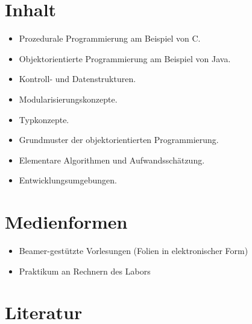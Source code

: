 \hypertarget{inhaltpathlabelmi-2017modulbeschreibungen-bachelorba_algorithmenundprogrammierung1}{%
\section*{Inhalt\label{/mi-2017/modulbeschreibungen-bachelor/BA_AlgorithmenundProgrammierung1}}\label{inhaltpathlabelmi-2017modulbeschreibungen-bachelorba_algorithmenundprogrammierung1}}

\begin{itemize}
\tightlist
\item
  Prozedurale Programmierung am Beispiel von C.
\item
  Objektorientierte Programmierung am Beispiel von Java.
\item
  Kontroll- und Datenstrukturen.
\item
  Modularisierungskonzepte.
\item
  Typkonzepte.
\item
  Grundmuster der objektorientierten Programmierung.
\item
  Elementare Algorithmen und Aufwandsschätzung.
\item
  Entwicklungsumgebungen.
\end{itemize}

\hypertarget{medienformenpathlabelmi-2017modulbeschreibungen-bachelorba_algorithmenundprogrammierung1}{%
\section*{Medienformen\label{/mi-2017/modulbeschreibungen-bachelor/BA_AlgorithmenundProgrammierung1}}\label{medienformenpathlabelmi-2017modulbeschreibungen-bachelorba_algorithmenundprogrammierung1}}

\begin{itemize}
\tightlist
\item
  Beamer-gestützte Vorlesungen (Folien in elektronischer Form)
\item
  Praktikum an Rechnern des Labors
\end{itemize}

\hypertarget{literaturpathlabelmi-2017modulbeschreibungen-bachelorba_algorithmenundprogrammierung1}{%
\section*{Literatur\label{/mi-2017/modulbeschreibungen-bachelor/BA_AlgorithmenundProgrammierung1}}\label{literaturpathlabelmi-2017modulbeschreibungen-bachelorba_algorithmenundprogrammierung1}}

